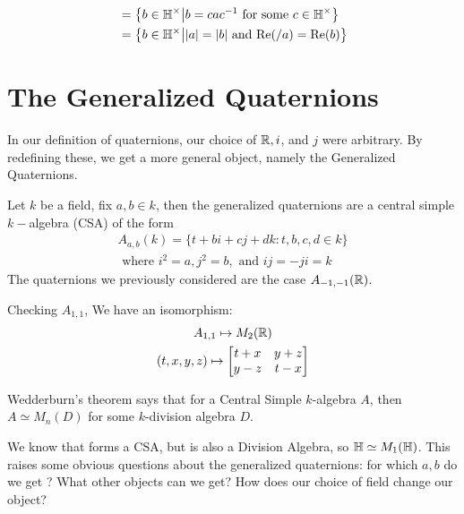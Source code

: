\documentclass{article}
\begin{document}
\begin{align*}
    [a] &= \left \{b \in \bH^\times \big | b = cac^{-1} \text{ for some } c \in \bH^\times \right \} \\
        &= \left \{b \in \bH^\times \big | |a| = |b| \text{ and Re} (/a) = \text{Re}(b) \right \}
\end{align*}


\section{The Generalized Quaternions}
In our definition of quaternions, our choice of $\protect\mathbb{R}, i$, and $j$ were arbitrary. By redefining these, we get a more general object, namely the Generalized Quaternions. 

Let $k$ be a field, fix $a,b \in k$, then the generalized quaternions are a central simple $k-$algebra (CSA) of the form 
\begin{gather*}
    A_{a,b}(k) = \{t + bi + cj + dk : t,b,c,d \in k\} \\
    \text{ where }i^2 =a, j^2 = b, \text{ and } ij = -ji=k
\end{gather*}
The quaternions we previously considered are the case $A_{-1, -1}(\protect\mathbb{R})$. 

Checking $A_{1,1}$, We have an isomorphism:
\begin{gather*}
    A_{1,1} \mapsto M_2(\protect\mathbb{R}) \\
    (t,x,y,z) \mapsto
    \begin{bmatrix}
    t+x & y + z \\
    y-z & t-x
    \end{bmatrix}
\end{gather*}

Wedderburn's theorem says that for a Central Simple $k$-algebra $A$, then $A\simeq M_n(D)$ for some $k$-division algebra $D$. 

We know that \bH forms a CSA, but \bH is also a Division Algebra, so $\protect\mathbb{H} \simeq M_1(\protect\mathbb{H})$. This raises some obvious questions about the generalized quaternions: for which $a,b$ do we get \bH? What other objects can we get? How does our choice of field change our object? 
\end{document}
